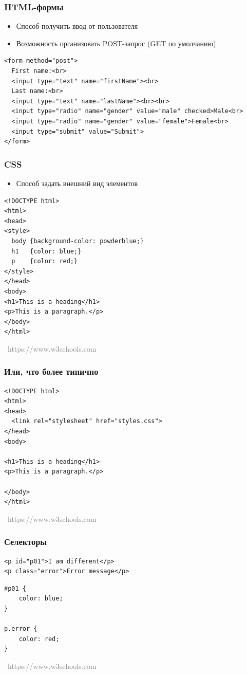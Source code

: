 \documentclass[xetex,mathserif,serif]{beamer}
\newcommand{\attribution}[1] {
\vspace{-5mm}\begin{flushright}\begin{scriptsize}\textcolor{gray}{\textcopyright\, #1}\end{scriptsize}\end{flushright}
}
\begin{document}
	\begin{frame}[fragile]
		\frametitle{HTML-формы}
		\begin{itemize}
			\item Способ получить ввод от пользователя
			\item Возможность организовать POST-запрос (GET по умолчанию)
		\end{itemize}
		\begin{verbatim}
<form method="post">
  First name:<br>
  <input type="text" name="firstName"><br>
  Last name:<br>
  <input type="text" name="lastName"><br><br>
  <input type="radio" name="gender" value="male" checked>Male<br>
  <input type="radio" name="gender" value="female">Female<br>
  <input type="submit" value="Submit">
</form>
		\end{verbatim}
	\end{frame}

	\begin{frame}[fragile]
		\frametitle{CSS}
		\begin{itemize}
			\item Способ задать внешний вид элементов
		\end{itemize}
		\begin{verbatim}
<!DOCTYPE html>
<html>
<head>
<style>
  body {background-color: powderblue;}
  h1   {color: blue;}
  p    {color: red;}
</style>
</head>
<body>
<h1>This is a heading</h1>
<p>This is a paragraph.</p>
</body>
</html>
		\end{verbatim}
		\attribution{https://www.w3schools.com}
	\end{frame}

	\begin{frame}[fragile]
		\frametitle{Или, что более типично}
		\begin{verbatim}
<!DOCTYPE html>
<html>
<head>
  <link rel="stylesheet" href="styles.css">
</head>
<body>

<h1>This is a heading</h1>
<p>This is a paragraph.</p>

</body>
</html>
		\end{verbatim}
		\attribution{https://www.w3schools.com}
	\end{frame}

	\begin{frame}[fragile]
		\frametitle{Селекторы}
		\begin{verbatim}
<p id="p01">I am different</p>
<p class="error">Error message</p>
		\end{verbatim}
		\vspace{5mm}
		\begin{verbatim}
#p01 {
    color: blue;
}

p.error {
    color: red;
}
		\end{verbatim}
		\attribution{https://www.w3schools.com}
	\end{frame}
\end{document}

